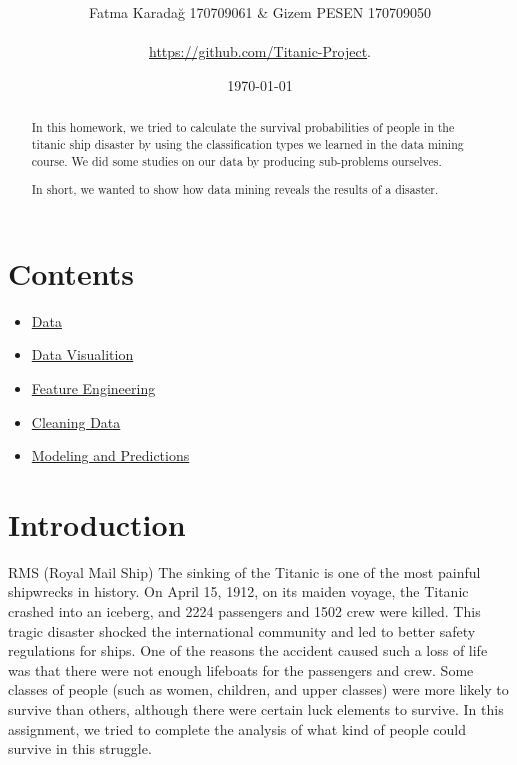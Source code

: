 \documentclass[onecolumn]{article}
\title{\spacecaps{CENG 3521 \\Data Mining \\TITANIC PROJECT }\\ 
\color{blue!75!black}
\normalsize
\spacesc{} }
\author{Fatma Karadağ 170709061  & Gizem PESEN 170709050\\\\ \url{https://github.com/Titanic-Project}.\\}
\date{\today}
\begin{document}
\maketitle

\begin{abstract}

In this homework, we tried to calculate the survival probabilities of people in the titanic ship disaster by using the classification types we learned in the data mining course.
We did some studies on our data by producing sub-problems ourselves.


In short, we wanted to show how data mining reveals the results of a disaster.

    
\end{abstract}
    
\section{Contents }
\begin{itemize}
\color{blue!75!black}
\item \hyperref[sec:1]{Data}
\item \hyperref[sec:2]{Data Visualition}
\item \hyperref[sec:2]{Feature Engineering}
\item \hyperref[sec:2]{Cleaning Data}
\item \hyperref[sec:2]{Modeling and Predictions}
\end{itemize}



\section{Introduction}


RMS (Royal Mail Ship) The sinking of the Titanic is one of the most painful shipwrecks in history. On April 15, 1912, on its maiden voyage, the Titanic crashed into an iceberg, and 2224 passengers and 1502 crew were killed. This tragic disaster shocked the international community and led to better safety regulations for ships. One of the reasons the accident caused such a loss of life was that there were not enough lifeboats for the passengers and crew. Some classes of people (such as women, children, and upper classes) were more likely to survive than others, although there were certain luck elements to survive. In this assignment, we tried to complete the analysis of what kind of people could survive in this struggle.
\end{document}
